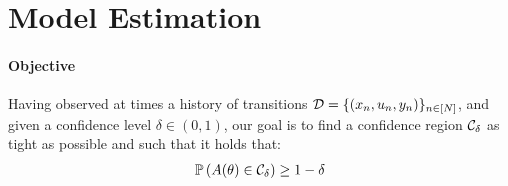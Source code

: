 \documentclass{article}
\begin{document}


\section{Model Estimation}

\paragraph{Objective}
Having observed at times a history of transitions $\mathcal{D} = \{(x_n, u_n, y_n)\}_{n\in[N]}$, and given a confidence level $\delta\in(0, 1)$, our goal is to find a confidence region $\mathcal{C}_\delta$ as tight as possible and such that it holds that:
\begin{align}
\mathbb{P}\left(A(\theta)\in \mathcal{C}_\delta\right) \geq 1-\delta
\label{eq:polytope}
\end{align}


\end{document}
